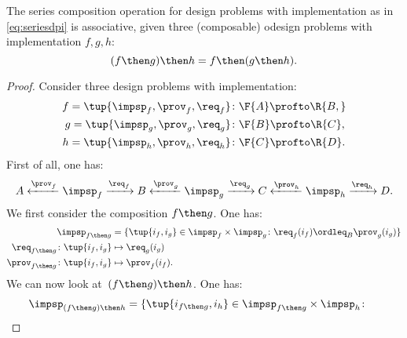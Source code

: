 {    \begin{lemma}
        The series composition operation for design problems with implementation as in \cref{eq:seriesdpi} is associative, \ie  given three (composable) odesign problems with implementation $f,g,h$:
        \begin{equation}
        (f\then g)
            \then h = f\then (g\then h).
        \end{equation}
    \end{lemma}
    \begin{proof}
        Consider three design problems with implementation:
        \begin{equation}
            \begin{aligned}
                f=\tup{{\impsp_f, \prov_f, \req_f} }&\colon \F{A} \profto\R{B,}\\
                g=\tup{\impsp_g, \prov_g, \req_g}&\colon \F{B} \profto \R{C},\\
                h=\tup{\impsp_h, \prov_h, \req_h}&\colon \F{C} \profto \R{D}.
            \end{aligned}
        \end{equation}
        First of all, one has:
        \begin{equation}
            A \xleftarrow{\prov_f} \impsp_f \xrightarrow{\req_f} B
            \xleftarrow{\prov_g} \impsp_g \xrightarrow{\req_g} C
            \xleftarrow{\prov_h} \impsp_h \xrightarrow{\req_h} D.
        \end{equation}
        We first consider the composition $f\then g$.
        One has:
        \begin{equation}
            \begin{aligned}
                \impsp_{f\then g} &= \{
                \tup{i_f,i_g} \in \impsp_f \times \impsp_g \colon
                \req_f(i_f) \ordleq_{B} \prov_g(i_g)
                \}\\
                \req_{f\then g}  \colon  \tup{i_f,i_g} &\mapsto \req_g(i_g) \\
                \prov_{f\then g}  \colon  \tup{i_f,i_g} &\mapsto \prov_f(i_f).
            \end{aligned}
        \end{equation}
        We can now look at~$(f\then g)\then h$.
        One has:
        \begin{equation}
            \begin{aligned}
                &\impsp_{(f\then g)\then h} = \{
                \tup{i_{f\then g},i_h} \in \impsp_{f\then g} \times \impsp_{h}\colon

\end{aligned}
\end{equation}
\end{proof}}
